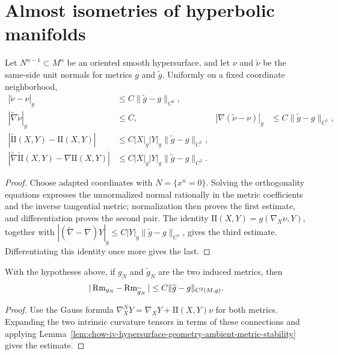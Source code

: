 \section{Almost isometries of hyperbolic manifolds}

\begin{lemma}
\label{lem:chow-iv-hypersurface-geometry-ambient-metric-stability}
Let \(N^{n-1}\subset M^n\) be an oriented smooth hypersurface, and let \(\nu\)
and \(\widetilde\nu\) be the same-side unit normals for metrics \(g\) and
\(\widetilde g\).  Uniformly on a fixed coordinate neighborhood,
\begin{align*}
 |\widetilde\nu-\nu|_g&\le C\|\widetilde g-g\|_{C^0},\\
 |\widetilde\nabla\widetilde\nu|_g&\le C,
 &|\nabla(\widetilde\nu-\nu)|_g&\le C\|\widetilde g-g\|_{C^1},\\
 |\widetilde{\mathrm{II}}(X,Y)-\mathrm{II}(X,Y)|
 &\le C|X|_g|Y|_g\|\widetilde g-g\|_{C^1},\\
 |\widetilde\nabla\widetilde{\mathrm{II}}(X,Y)-\nabla\mathrm{II}(X,Y)|
 &\le C|X|_g|Y|_g\|\widetilde g-g\|_{C^2}.
\end{align*}
\end{lemma}
\begin{proof}
Choose adapted coordinates with \(N=\{x^n=0\}\).  Solving the orthogonality
equations expresses the unnormalized normal rationally in the metric
coefficients and the inverse tangential metric; normalization then proves the
first estimate, and differentiation proves the second pair.  The identity
\(\mathrm{II}(X,Y)=g(\nabla_X\nu,Y)\), together with
\(|(\widetilde\nabla-\nabla)Y|_g\le C|Y|_g\|\widetilde g-g\|_{C^1}\), gives
the third estimate.  Differentiating this identity once more gives the last.
\end{proof}

\begin{lemma}
\label{lem:chow-iv-hypersurface-intrinsic-curvature-stability}
With the hypotheses above, if \(g_N\) and \(\widetilde g_N\) are the two induced
metrics, then
\[
 |\operatorname{Rm}_{g_N}-\operatorname{Rm}_{\widetilde g_N}|
 \le C\|\widetilde g-g\|_{C^2(M,g)}.
\]
\end{lemma}
\begin{proof}
Use the Gauss formula
\(\nabla^N_XY=\nabla_XY+\mathrm{II}(X,Y)\nu\) for both metrics.  Expanding the
two intrinsic curvature tensors in terms of these connections and applying
Lemma~\ref{lem:chow-iv-hypersurface-geometry-ambient-metric-stability} gives
the estimate.
\end{proof}

